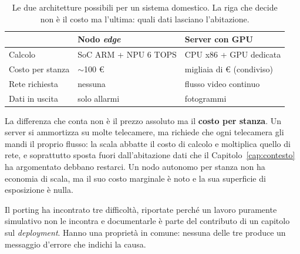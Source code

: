 \begin{table}[ht]
\centering
\caption{Le due architetture possibili per un sistema domestico. La riga che
decide non è il costo ma l'ultima: quali dati lasciano l'abitazione.}
\label{tab:edge_vs_server}
\begin{tabular}{lll}
\toprule
 & Nodo \emph{edge} & Server con GPU \\
\midrule
Calcolo & SoC ARM + NPU 6 TOPS & CPU x86 + GPU dedicata \\
Costo per stanza & $\sim$100 € & migliaia di € (condiviso) \\
Rete richiesta & nessuna & flusso video continuo \\
Dati in uscita & solo allarmi & fotogrammi \\
\bottomrule
\end{tabular}
\end{table}

La differenza che conta non è il prezzo assoluto ma il \textbf{costo per stanza}. Un server si ammortizza su molte telecamere, ma richiede che ogni telecamera gli mandi il proprio flusso: la scala abbatte il costo di calcolo e moltiplica quello di rete, e soprattutto sposta fuori dall'abitazione dati che il Capitolo~\ref{cap:contesto} ha argomentato debbano restarci. Un nodo autonomo per stanza non ha economia di scala, ma il suo costo marginale è noto e la sua superficie di esposizione è nulla.

\medskip

Il porting ha incontrato tre difficoltà, riportate perché un lavoro puramente simulativo non le incontra e documentarle è parte del contributo di un capitolo sul \emph{deployment}. Hanno una proprietà in comune: nessuna delle tre produce un messaggio d'errore che indichi la causa.

